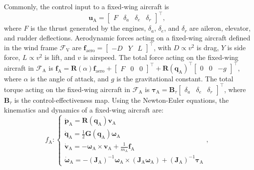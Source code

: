 \documentclass[letterpaper, 10 pt, conference]{ieeeconf}  %
\begin{document}
Commonly, the control input to a fixed-wing aircraft is 
\begin{equation}
\mathbf{u}_\text{A} = \begin{bmatrix} F & \delta_a & \delta_e & \delta_r \end{bmatrix}^\top,
\label{eq:plane_u}
\end{equation}
where $F$ is the thrust generated by the engines, $\delta_a$, $\delta_e$, and $\delta_r$ are  aileron, elevator, and
rudder deflections.
Aerodynamic forces acting on a fixed-wing aircraft defined in the wind frame $\mathcal{F}_\text{V}$ are $\mathbf{f}_\text{aero} = \begin{bmatrix} -D & Y & L \end{bmatrix}^\top$, with $D \propto v^2$ is drag, $Y$ is side force, $L \propto v^2$ is lift, and $v$ is airspeed. The total force acting on the fixed-wing aircraft in $\mathcal{F}_\text{A}$ is $\mathbf{f}_\text{A} = \mathbf{R}(\alpha) \mathbf{f}_\text{aero} + \begin{bmatrix} F & 0 & 0 \end{bmatrix}^\top + \mathbf{R}\left(\mathbf{q}_\text{A}\right)^\top \begin{bmatrix} 0 & 0 & -g \end{bmatrix}^\top$, where $\alpha$ is the angle of attack, and $g$ is the gravitational constant.
The total torque acting on the fixed-wing aircraft in $\mathcal{F}_\text{A}$ is $\boldsymbol{\tau}_\text{A} = \mathbf{B}_\tau \begin{bmatrix} \delta_a & \delta_e & \delta_r \end{bmatrix}^\top$, where $\mathbf{B}_\tau$ is the control-effectiveness map.
Using the Newton-Euler equations, the kinematics and dynamics of a fixed-wing aircraft are:
\begin{equation}
f_\text{A}:
\begin{cases}
\dot{\mathbf{p}}_\text{A} = \mathbf{R}\left(\mathbf{q}_\text{A}\right) \mathbf{v}_\text{A} \\
\dot{\mathbf{q}}_\text{A} = \frac{1}{2} \mathbf{G}\left(\mathbf{q}_\text{A}\right) \boldsymbol{\omega}_\text{A} \\
\dot{\mathbf{v}}_\text{A} = -\boldsymbol{\omega}_\text{A} \times \mathbf{v}_\text{A} + \frac{1}{m_\text{A}} \mathbf{f}_\text{A} \\
\dot{\boldsymbol{\omega}}_\text{A} = -\left(\mathbf{J}_\text{A}\right)^{-1} \boldsymbol{\omega}_\text{A} \times (\mathbf{J}_\text{A} \boldsymbol{\omega}_\text{A}) + \left(\mathbf{J}_\text{A}\right)^{-1} \boldsymbol{\tau}_\text{A}
\end{cases},
\label{eq:plane_dynamics}
\end{equation} 
\end{document}
